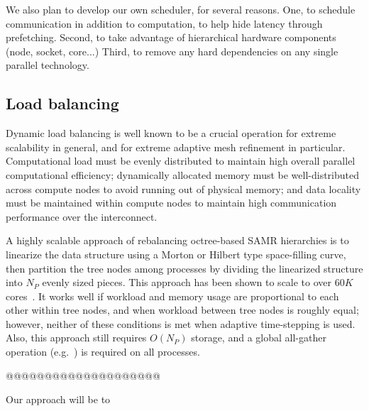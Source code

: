 \documentclass[14pt,letter]{article}
\begin{document}

We also plan to develop our own scheduler, for several reasons.  One,
to schedule communication in addition to computation, to help hide
latency through prefetching.  Second, to take advantage of
hierarchical hardware components (node, socket, core...)  Third, to
remove any hard dependencies on any single parallel technology.

\subsection{Load balancing} \label{ss:loadbalancing}

Dynamic load balancing is well known to be a crucial operation for
extreme scalability in general, and for extreme adaptive mesh
refinement in particular.  Computational load must be evenly
distributed to maintain high overall parallel computational
efficiency; dynamically allocated memory must be well-distributed
across compute nodes to avoid running out of physical memory; and data
locality must be maintained within compute nodes to maintain high
communication performance over the interconnect.

A highly scalable approach of rebalancing octree-based SAMR
hierarchies is to linearize the data structure using a Morton or
Hilbert type space-filling curve, then partition the tree nodes among
processes by dividing the linearized structure into $N_P$ evenly sized
pieces.  This approach has been shown to scale to over $60K$
cores~\cite{@@@ART}.  It works well if workload and memory usage are
proportional to each other within tree nodes, and when workload
between tree nodes is roughly equal; however, neither of these
conditions is met when adaptive time-stepping is used.  Also, this
approach still requires $O(N_P)$ storage, and a global all-gather
operation (e.g.~) is required on all processes.

@@@@@@@@@@@@@@@@@@@@

Our approach will be to 
\end{document}
